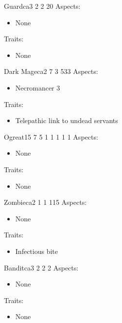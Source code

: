 \documentclass[11pt]{article}
\begin{document}
{\begin{npc}{Guard}{ca}{3 2 2 2}{0}
Aspects:
\begin{itemize}
\item None
\end{itemize}
Traits:
\begin{itemize}
\item None
\end{itemize}
\end{npc}

\begin{npc}{Dark Mage}{ca}{2 7 3 5}{33}
Aspects:
\begin{itemize}
\item Necromancer 3
\end{itemize}
\columnbreak
Traits:
\begin{itemize}
\item Telepathic link to undead servants
\end{itemize}
\end{npc}

\begin{npc}{Ogre}{at}{15 7 5 1 1 1 1 1}{}
Aspects:
\begin{itemize}
\item None
\end{itemize}
Traits:
\begin{itemize}
\item None
\end{itemize}
\end{npc}

\begin{npc}{Zombie}{ca}{2 1 1 1}{15}
Aspects:
\begin{itemize}
\item None
\end{itemize}
Traits:
\begin{itemize}
\item Infectious bite
\end{itemize}
\end{npc}

\begin{npc}{Bandit}{ca}{3 2 2 2}{}
Aspects:
\begin{itemize}
\item None
\end{itemize}
Traits:
\begin{itemize}
\item None
\end{itemize}
\end{npc}

}
\end{document}
